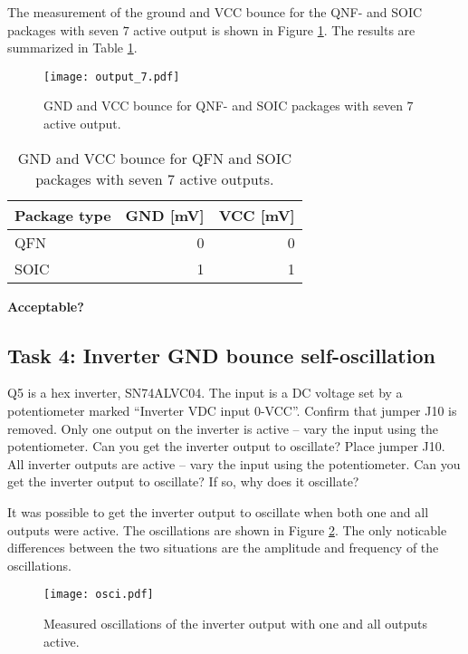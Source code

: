 \documentclass[../main.tex]{subfiles}
\begin{document}
\solution

The measurement of the ground and VCC bounce for the QNF- and SOIC packages with seven \(\textit{7}\) active output is shown in Figure \ref{fig:gnd_vcc_output_7}. The results are summarized in Table \ref{tab:output_7}.

\begin{figure}[H]
    \centering
    \texttt{[image: output\_7.pdf]}
    \caption{GND and VCC bounce for QNF- and SOIC packages with seven \(\textit{7}\) active output.}
    \label{fig:gnd_vcc_output_7}
\end{figure}
\begin{table}[H]
    \centering
    \begin{tabular}{l | r r}
        \toprule[1pt]
        Package type    & GND [mV]  & VCC [mV]\\
        \midrule
        QFN             & 0         & 0  \\
        SOIC            & 1         & 1  \\
        \bottomrule[1pt]
    \end{tabular}
    \caption{GND and VCC bounce for QFN and SOIC packages with seven \(\textit{7}\) active outputs.}
    \label{tab:output_7}
\end{table}

\textbf{Acceptable?}

\subsection{Task 4: Inverter GND bounce self-oscillation}

Q5 is a hex inverter, SN74ALVC04. The input is a DC voltage set by a potentiometer marked “Inverter VDC input 0-VCC”.
\vspace{10pt}
Confirm that jumper J10 is removed. Only one output on the inverter is active – vary the input using the potentiometer. Can you get the inverter output to oscillate?
\vspace{10pt}
Place jumper J10. All inverter outputs are active – vary the input using the potentiometer. Can you get the inverter output to oscillate? If so, why does it oscillate?

\solution

It was possible to get the inverter output to oscillate when both one and all outputs were active. The oscillations are shown in Figure \ref{fig:inverter_oscillation}. The only noticable differences between the two situations are the amplitude and frequency of the oscillations. %

\begin{figure}[H]
    \centering
    \texttt{[image: osci.pdf]}
    \caption{Measured oscillations of the inverter output with one and all outputs active.}
    \label{fig:inverter_oscillation}
\end{figure}
\end{document}
